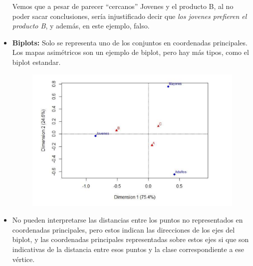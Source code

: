 \begin{itemize}
    Vemos que a pesar de parecer ``cercanos'' Jovenes y el producto B, al no poder sacar conclusiones, sería injustificado decir que \textit{los jovenes prefieren el producto B}, y además, en este ejemplo, falso.
    \item \textbf{Biplots:} Solo se representa uno de los conjuntos en coordenadas principales. Los mapas asimétricos son un ejemplo de biplot, pero hay más tipos, como el biplot estandar.
    \begin{figure}[ht]
        \includegraphics[width=\textwidth]{assets/grafico_biplot.png}
    \end{figure}
    \item No pueden interpretarse las distancias entre los puntos no representados en coordenadas principales, pero estos indican las direcciones de los ejes del biplot, y las coordenadas principales representadas sobre estos ejes si que son indicativas de la distancia entre esos puntos y la clase correspondiente a ese vértice.

    \newpage


\end{itemize}
